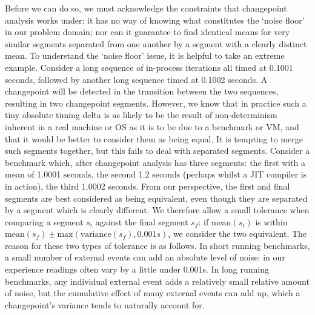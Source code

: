 \documentclass[acmlarge]{acmart}\settopmatter{printfolios=true}
\begin{document}
Before we can do so, we must
acknowledge the constraints that changepoint analysis works under: it has
no way of knowing what constitutes the `noise floor' in our problem domain; nor can it
guarantee to find identical means for very similar segments separated from
one another by a segment with a clearly distinct mean.
To understand the `noise floor' issue, it
is helpful to take an extreme example. Consider a long sequence of in-process
iterations all timed at 0.1001 seconds, followed by another long sequence timed
at 0.1002 seconds. A changepoint will be detected in the transition between the
two sequences, resulting in two changepoint segments. However, we know that in practice such a tiny absolute timing
delta is as likely to be the result of non-determinism inherent in a real
machine or OS as it is to be due to a benchmark or VM, and that it would be
better to consider them as being equal. It is tempting to merge such segments
together, but this fails to deal with separated segments. Consider a
benchmark which, after changepoint analysis has three segments: the first with a
mean of 1.0001 seconds, the second 1.2 seconds (perhaps whilst a JIT compiler is
in action), the third 1.0002 seconds. From our perspective, the first and final
segments are best considered as being equivalent, even though they are separated by a
segment which is clearly different. We therefore allow a small tolerance
when comparing a segment $s_i$ against the final segment $s_f$: if $\textrm{mean}(s_i)$
is within $\textrm{mean}(s_f) \pm \textrm{max}(\textrm{variance}(s_f), 0.001s)$,
we consider the two equivalent. The reason for these two types of tolerance
is as follows. In short running benchmarks, a small number of external events can add an absolute
level of noise: in our experience readings often vary by a
little under 0.001s. In long running benchmarks, any individual external
event adds a relatively small relative amount of noise, but the cumulative
effect of many external events can add up, which a changepoint's variance
tends to naturally account for.
\end{document}
